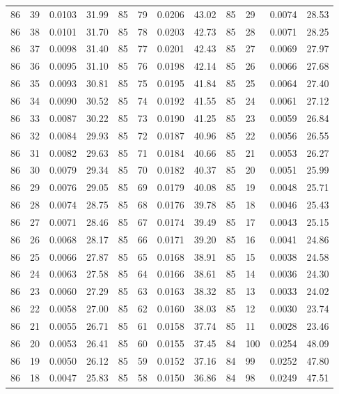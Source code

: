\begin{tabular}{llll|llll|llll}
86 & 39 & 0.0103 & 31.99 & 85 & 79 & 0.0206 & 43.02 & 85 & 29 & 0.0074 & 28.53\\
86 & 38 & 0.0101 & 31.70 & 85 & 78 & 0.0203 & 42.73 & 85 & 28 & 0.0071 & 28.25\\
86 & 37 & 0.0098 & 31.40 & 85 & 77 & 0.0201 & 42.43 & 85 & 27 & 0.0069 & 27.97\\
86 & 36 & 0.0095 & 31.10 & 85 & 76 & 0.0198 & 42.14 & 85 & 26 & 0.0066 & 27.68\\
86 & 35 & 0.0093 & 30.81 & 85 & 75 & 0.0195 & 41.84 & 85 & 25 & 0.0064 & 27.40\\
86 & 34 & 0.0090 & 30.52 & 85 & 74 & 0.0192 & 41.55 & 85 & 24 & 0.0061 & 27.12\\
86 & 33 & 0.0087 & 30.22 & 85 & 73 & 0.0190 & 41.25 & 85 & 23 & 0.0059 & 26.84\\
86 & 32 & 0.0084 & 29.93 & 85 & 72 & 0.0187 & 40.96 & 85 & 22 & 0.0056 & 26.55\\
86 & 31 & 0.0082 & 29.63 & 85 & 71 & 0.0184 & 40.66 & 85 & 21 & 0.0053 & 26.27\\
86 & 30 & 0.0079 & 29.34 & 85 & 70 & 0.0182 & 40.37 & 85 & 20 & 0.0051 & 25.99\\
86 & 29 & 0.0076 & 29.05 & 85 & 69 & 0.0179 & 40.08 & 85 & 19 & 0.0048 & 25.71\\
86 & 28 & 0.0074 & 28.75 & 85 & 68 & 0.0176 & 39.78 & 85 & 18 & 0.0046 & 25.43\\
86 & 27 & 0.0071 & 28.46 & 85 & 67 & 0.0174 & 39.49 & 85 & 17 & 0.0043 & 25.15\\
86 & 26 & 0.0068 & 28.17 & 85 & 66 & 0.0171 & 39.20 & 85 & 16 & 0.0041 & 24.86\\
86 & 25 & 0.0066 & 27.87 & 85 & 65 & 0.0168 & 38.91 & 85 & 15 & 0.0038 & 24.58\\
86 & 24 & 0.0063 & 27.58 & 85 & 64 & 0.0166 & 38.61 & 85 & 14 & 0.0036 & 24.30\\
86 & 23 & 0.0060 & 27.29 & 85 & 63 & 0.0163 & 38.32 & 85 & 13 & 0.0033 & 24.02\\
86 & 22 & 0.0058 & 27.00 & 85 & 62 & 0.0160 & 38.03 & 85 & 12 & 0.0030 & 23.74\\
86 & 21 & 0.0055 & 26.71 & 85 & 61 & 0.0158 & 37.74 & 85 & 11 & 0.0028 & 23.46\\
86 & 20 & 0.0053 & 26.41 & 85 & 60 & 0.0155 & 37.45 & 84 & 100 & 0.0254 & 48.09\\
86 & 19 & 0.0050 & 26.12 & 85 & 59 & 0.0152 & 37.16 & 84 & 99 & 0.0252 & 47.80\\
86 & 18 & 0.0047 & 25.83 & 85 & 58 & 0.0150 & 36.86 & 84 & 98 & 0.0249 & 47.51\\

\end{tabular}
